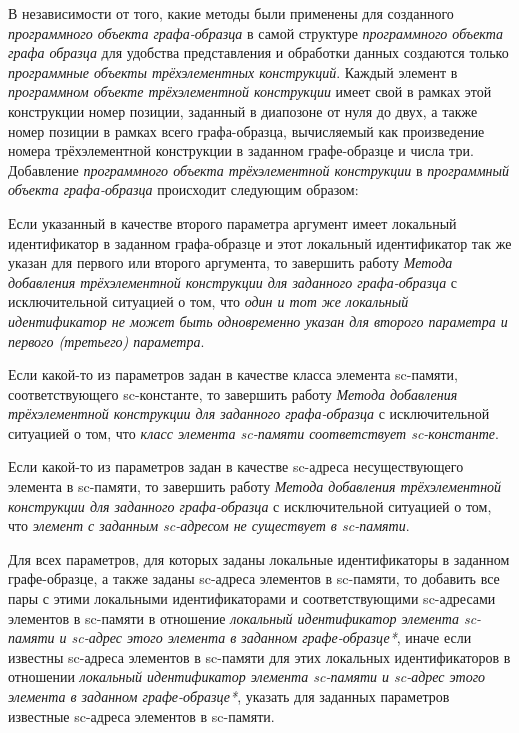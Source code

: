 В независимости от того, какие методы были применены для созданного \textit{программного объекта графа-образца} в самой структуре \textit{программного объекта графа образца}  для удобства представления и обработки данных создаются только \textit{программные объекты трёхэлементных конструкций}. Каждый элемент в \textit{программном объекте трёхэлементной конструкции} имеет свой в рамках этой конструкции номер позиции, заданный в диапозоне от нуля до двух, а также номер позиции в рамках всего графа-образца, вычисляемый как произведение номера трёхэлементной конструкции в заданном графе-образце и числа три. Добавление \textit{программного объекта трёхэлементной конструкции} в \textit{программный объекта графа-образца} происходит следующим образом:
\begin{textitemize}
	\item Если указанный в качестве второго параметра аргумент имеет локальный идентификатор в заданном графа-образце и этот локальный идентификатор так же указан для первого или второго аргумента, то завершить работу \textit{Метода добавления трёхэлементной конструкции для заданного графа-образца} с исключительной ситуацией о том, что \textit{один и тот же локальный идентификатор не может быть одновременно указан для второго параметра и первого (третьего) параметра}.
	\item Если какой-то из параметров задан в качестве класса элемента sc-памяти, соответствующего sc-константе, то завершить работу \textit{Метода добавления трёхэлементной конструкции для заданного графа-образца} с исключительной ситуацией о том, что \textit{класс элемента sc-памяти соответствует sc-константе}.
	\item Если какой-то из параметров задан в качестве sc-адреса несуществующего элемента в sc-памяти, то завершить работу \textit{Метода добавления трёхэлементной конструкции для заданного графа-образца} с исключительной ситуацией о том, что \textit{элемент с заданным sc-адресом не существует в sc-памяти}.
	\item Для всех параметров, для которых заданы локальные идентификаторы в заданном графе-образце, а также заданы sc-адреса элементов в sc-памяти, то добавить все пары с этими локальными идентификаторами и соответствующими sc-адресами элементов в sc-памяти в отношение \textit{локальный идентификатор элемента sc-памяти и sc-адрес этого элемента в заданном графе-образце*}, иначе если известны sc-адреса элементов в sc-памяти для этих локальных идентификаторов в отношении \textit{локальный идентификатор элемента sc-памяти и sc-адрес этого элемента в заданном графе-образце*}, указать для заданных параметров известные sc-адреса элементов в sc-памяти.

\end{textitemize}
